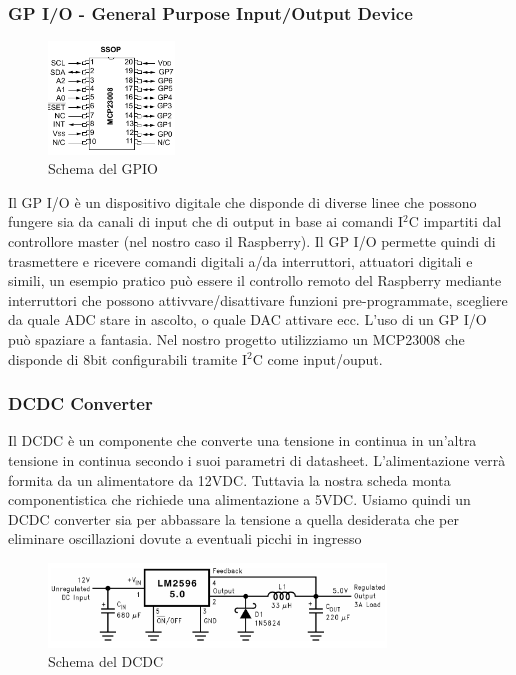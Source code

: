 \documentclass[10pt]{article}
\begin{document}
		\subsubsection{GP I/O - General Purpose Input/Output Device}\label{sec:gpio}
		\begin{figure}
		\vspace{-20pt}
			\centering
			\includegraphics[width=0.3\textwidth]{src/gpio_scheme}
			\caption{Schema del GPIO}\label{fig:gpio}
			\vspace{-10pt}
		\end{figure}
		Il GP I/O è un dispositivo digitale che disponde di diverse linee che possono fungere sia da canali di input che di output in base ai comandi I\(^2\)C impartiti dal controllore master (nel nostro caso il Raspberry). Il GP I/O permette quindi di trasmettere e ricevere comandi digitali a/da interruttori, attuatori digitali e simili, un esempio pratico può essere il controllo remoto del Raspberry mediante interruttori che possono attivvare/disattivare funzioni pre-programmate, scegliere da quale ADC stare in ascolto, o quale DAC attivare ecc. L'uso di un GP I/O può spaziare a fantasia. Nel nostro progetto utilizziamo un MCP23008 che disponde di 8bit configurabili tramite I\(^2\)C come input/ouput.

		
		
\newpage
		\subsubsection{DCDC Converter}\label{sec:dcdc}
		Il DCDC è un componente che converte una tensione in continua in un'altra tensione in continua secondo i suoi parametri di datasheet.
		L'alimentazione verrà formita da un alimentatore da 12VDC. Tuttavia la nostra scheda monta componentistica che richiede una alimentazione a 5VDC. Usiamo quindi un DCDC converter sia per abbassare la tensione a quella desiderata che per eliminare oscillazioni dovute a eventuali picchi in ingresso
		\begin{figure}[h]
			\centering
			\includegraphics[width=0.8\textwidth]{src/dcdc_scheme}
			\caption{Schema del DCDC}\label{fig:dcdc}
		\end{figure}
		
\end{document}

